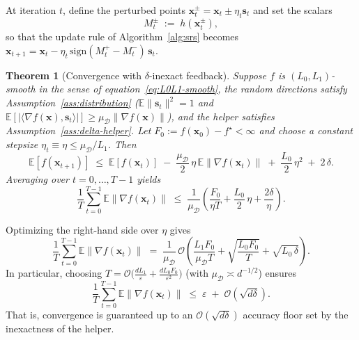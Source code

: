 \documentclass[twoside]{article}
\theoremstyle{plain}
\newtheorem{theorem}[lemma]{Theorem}
\theoremstyle{definition}
\theoremstyle{remark}
\def\eqref#1{equation~\ref{#1}}
\def\cO{{\mathcal{O}}}
\def\cD{{\mathcal{D}}}
\def\vs{{\bm{s}}}
\def\vx{{\bm{x}}}
\newcommand{\E}{\mathbb{E}}
\begin{document}
At iteration $t$, define the perturbed points $\vx_t^\pm=\vx_t\pm \eta_t \vs_t$
and set the scalars
\[
  M_t^\pm \;:=\; h(\vx_t^\pm),
\]
so that the update rule of Algorithm~\ref{alg:srs} becomes
\(
  \vx_{t+1} = \vx_t - \eta_t\,\mathrm{sign}(M_t^+ - M_t^-)\,\vs_t.
\)
\begin{propbox}
\begin{theorem}[Convergence with $\delta$-inexact feedback]
\label{thm:helper-delta}
Suppose $f$ is $(L_0,L_1)$-smooth in the sense of \eqref{eq:L0L1-smooth},
the random directions satisfy Assumption~\ref{ass:distribution}
($\E\|\vs_t\|^2=1$ and $\E[|\langle \nabla f(\vx),\vs_t\rangle|]\ge
\mu_{\cD}\|\nabla f(\vx)\|$), and the helper satisfies
Assumption~\ref{ass:delta-helper}.
Let $F_0:=f(\vx_0)-f^\star<\infty$ and choose a constant stepsize
$\eta_t\equiv \eta \le \mu_{\cD}/L_1$. Then
\begin{equation}
\label{eq:helper-one-step}
\E[f(\vx_{t+1})]
\;\le\;
\E[f(\vx_t)]
\;-\;\frac{\mu_{\cD}}{2}\,\eta\,\E\|\nabla f(\vx_t)\|
\;+\;\frac{L_0}{2}\,\eta^2
\;+\; 2\,\delta.
\end{equation}
Averaging over $t=0,\dots,T-1$ yields
\begin{equation}
\label{eq:helper-avg-grad}
\frac{1}{T}\sum_{t=0}^{T-1}\E\|\nabla f(\vx_t)\|
\;\le\;
\frac{1}{\mu_{\cD}}
\left(
  \frac{F_0}{\eta T}
  + \frac{L_0}{2}\,\eta
  + \frac{2\delta}{\eta}
\right).
\end{equation}
\end{theorem}
\end{propbox}
Optimizing the right-hand side over $\eta$ gives
\begin{equation}
\label{eq:helper-optimized}
\frac{1}{T}\sum_{t=0}^{T-1}\E\|\nabla f(\vx_t)\|
\;=\;
\frac{1}{\mu_{\cD}}\,
\cO\!\left(
  \frac{L_1 F_0}{\mu_{\cD} T}
  + \sqrt{\frac{L_0 F_0}{T}}
  + \sqrt{L_0\,\delta}
\right).
\end{equation}
In particular, choosing
\(
T=\cO\!\big(\tfrac{dL_1}{\varepsilon}+\tfrac{dL_0 F_0}{\varepsilon^2}\big)
\)
(with $\mu_{\cD}\asymp d^{-1/2}$) ensures
\begin{equation}
\label{eq:helper-eps-floor}
\frac{1}{T}\sum_{t=0}^{T-1}\E\|\nabla f(\vx_t)\|
\;\le\;
\varepsilon \;+\; \cO(\sqrt{d\delta}).
\end{equation}
That is, convergence is guaranteed up to an $\cO(\sqrt{d\delta})$ accuracy floor
set by the inexactness of the helper.
\end{document}

